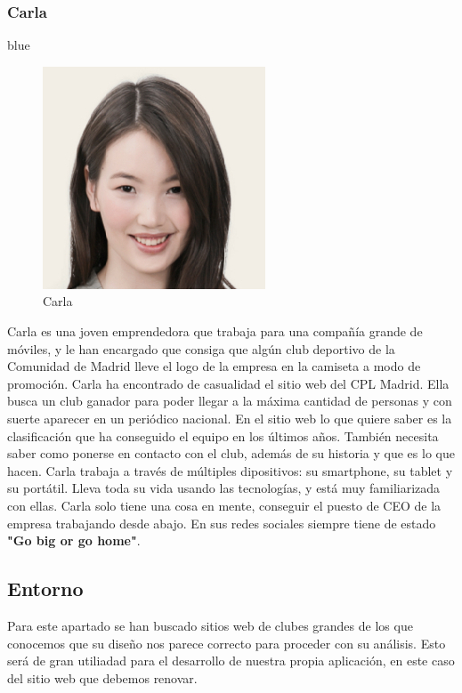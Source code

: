 \documentclass[10pt, spanish, pdftex]{template/UC3M_document}
\begin{document}
\subsubsection{Carla}
\begin{boxCarla}{}{blue}
  \begin{figure}
  \includegraphics[scale=1.5]{Images/Carla.jpg}
  \caption{Carla}
  \end{figure}
  \small Carla es una joven emprendedora que trabaja para una compañía grande de móviles, y le han encargado que consiga que algún club deportivo de la Comunidad de Madrid lleve el logo de la empresa en la camiseta a modo de promoción. Carla ha encontrado de casualidad el sitio web del CPL Madrid. Ella busca un club ganador para poder llegar a la máxima cantidad de personas y con suerte aparecer en un periódico nacional. En el sitio web lo que quiere saber es la clasificación que ha conseguido el equipo en los últimos años. También necesita saber como ponerse en contacto con el club, además de su historia y que es lo que hacen. Carla trabaja a través de múltiples dipositivos: su smartphone, su tablet y su portátil. Lleva toda su vida usando las tecnologías, y está muy familiarizada con ellas.
  Carla solo tiene una cosa en mente, conseguir el puesto de CEO de la empresa trabajando desde abajo. En sus redes sociales siempre tiene de estado \textbf{"Go big or go home"}.
\end{boxCarla}

\pagebreak

\subsection{Entorno}
Para este apartado se han buscado sitios web de clubes grandes de los que conocemos que su diseño nos parece correcto para proceder con su análisis. Esto será de gran utiliadad para el desarrollo de nuestra propia aplicación, en este caso del sitio web que debemos renovar.
\end{document}
